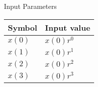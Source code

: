 \setlength{\arrayrulewidth}{0.3mm}
\setlength{\tabcolsep}{12pt}
\renewcommand{\arraystretch}{1.3}


\begin{center}
\caption{Input Parameters}
\begin{tabular}{ |p{2.0cm}|p{2.0cm}| }

\hline
 {Symbol}&{Input value}\\
\hline
$x(0)$ & $x(0) r^0$ \\
\hline
$x(1) $ & $x(0) r^1$ \\
\hline
$x(2)$ & $x(0) r^2$ \\
\hline
$x(3)$ & $x(0) r^3$ \\
\hline

\end{tabular}
\end{center}
